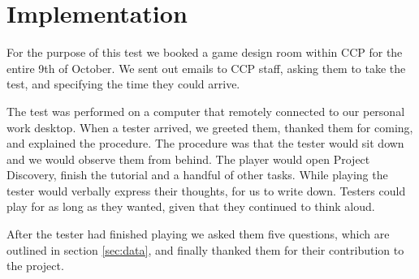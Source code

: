 \section{Implementation}\label{sec:implementation}
For the purpose of this test we booked a game design room within CCP for the entire 9th of October. We sent out emails to CCP staff, asking them to take the test, and specifying the time they could arrive.

The test was performed on a computer that remotely connected to our personal work desktop. When a tester arrived, we greeted them, thanked them for coming, and explained the procedure. The procedure was that the tester would sit down and we would observe them from behind. The player would open Project Discovery, finish the tutorial and a handful of other tasks. While playing the tester would verbally express their thoughts, for us to write down. Testers could play for as long as they wanted, given that they continued to think aloud.

After the tester had finished playing we asked them five questions, which are outlined in section \ref{sec:data}, and finally thanked them for their contribution to the project.